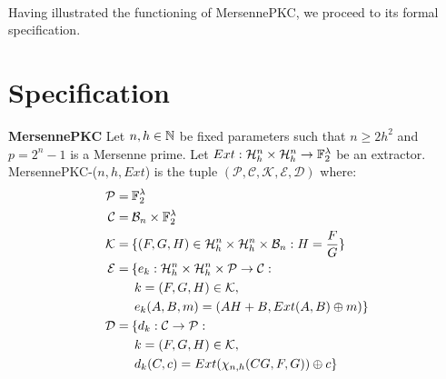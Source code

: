 \paragraph{}
Having illustrated the functioning of MersennePKC, we proceed to its formal specification.

\section{Specification}
\theoremstyle{definition}
\begin{definition}{\textbf{MersennePKC}}\label{mersennepkc-specification}
Let $n, h \in \mathbb{N}$ be fixed parameters such that $n \geq 2h^2$ and $p = 2^n -1$ is a Mersenne prime. Let $Ext: \mathcal{H}_h^n \times \mathcal{H}_h^n \rightarrow \mathbb{F}_2^\lambda$ be an extractor. MersennePKC-($n, h, Ext$) is the tuple $(\mathcal{P}, \mathcal{C}, \mathcal{K}, \mathcal{E}, \mathcal{D})$ where:
\begin{align*}
    \mathcal{P} =\:&\mathbb{F}_2^\lambda\\
    \mathcal{C} =\:&\mathcal{B}_n \times \mathbb{F}_2^\lambda\\
    \mathcal{K} =\:&\{ (F, G, H) \in \mathcal{H}_h^n \times \mathcal{H}_h^n \times \mathcal{B}_n : H = \frac{F}{G} \}\\
    \mathcal{E} =\:&\{e_k: \mathcal{H}_h^n \times \mathcal{H}_h^n \times \mathcal{P} \rightarrow \mathcal{C} :\\
    &\:k = (F, G, H) \in \mathcal{K},\\
    &\:e_k(A, B, m) = (AH + B, Ext(A, B) \oplus m) \}\\
    \mathcal{D} =\:&\{ d_k: \mathcal{C} \rightarrow \mathcal{P} :\\
    &\:k = (F, G, H) \in \mathcal{K},\\
    &\:d_k(C, c) = Ext(\chi_{n, h}(CG, F, G)) \oplus c \}
\end{align*}
\end{definition}

